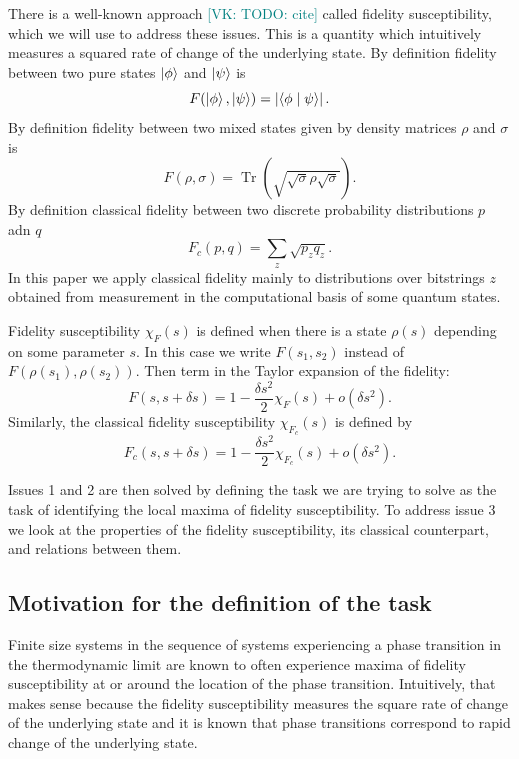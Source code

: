 \documentclass[
  american,aps,pra,reprint,floatfix,nofootinbib,superscriptaddress
]{revtex4-2}
\DeclareMathOperator{\Tr}{Tr}
\newcommand{\abs}[1]{\left|#1\right|}
\newcommand{\VK}[1]{\textcolor{teal}{[VK: #1]}}
\begin{document}
There is a well-known approach \VK{TODO: cite} called fidelity susceptibility,
which we will use to address these issues. This is a quantity which
intuitively measures a squared rate of change of the underlying state.
By definition fidelity between two pure states $\ket{\phi}$ and $\ket{\psi}$ is
\begin{equation}
\label{eq:def.F.pure}
  F(\ket{\phi}, \ket{\psi}) = \abs{\braket{\phi\mid \psi}}.
\end{equation}
By definition fidelity between two mixed states
given by density matrices $\rho$ and $\sigma$ is
\begin{equation}
\label{eq:def.F.mixed}
  F(\rho, \sigma) = \Tr\left(\sqrt{\sqrt{\sigma}\rho\sqrt{\sigma}}\right).
\end{equation}
By definition classical fidelity between two discrete probability distributions
$p$ adn $q$
\begin{equation}
\label{eq:def.Fc}
  F_c(p, q) = \sum_z \sqrt{p_z q_z}.
\end{equation}
In this paper we apply classical fidelity mainly to distributions over bitstrings
$z$ obtained from measurement in the computational basis of some quantum states.

Fidelity susceptibility $\chi_F(s)$ is defined when there is a state $\rho(s)$
depending on some parameter $s$. In this case we write $F(s_1, s_2)$ instead
of $F(\rho(s_1), \rho(s_2))$. Then
term in the Taylor expansion of the fidelity:
\begin{equation}
\label{eq:def.chiF}
  F(s, s + \delta s) = 1 - \frac{\delta s^2}{2} \chi_F(s) + o(\delta s^2).
\end{equation}
Similarly, the classical fidelity susceptibility $\chi_{F_c}(s)$ is defined by
\begin{equation}
\label{eq:def.chiFc}
  F_c(s, s + \delta s) = 1 - \frac{\delta s^2}{2} \chi_{F_c}(s) + o(\delta s^2).
\end{equation}

Issues 1 and 2 are then solved by defining the task we are trying to solve
as the task of identifying the local maxima of fidelity susceptibility.
To address issue 3 we look at the properties of the fidelity
susceptibility, its classical counterpart, and relations between them.

\subsection{Motivation for the definition of the task}
Finite size systems in the sequence of systems experiencing a phase transition
in the thermodynamic limit are known to often experience maxima of fidelity susceptibility at or around the location of the phase transition. Intuitively, that
makes sense because the fidelity susceptibility measures the square rate of change of the underlying state and it is known that phase transitions correspond to rapid change of the underlying state.
\end{document}
